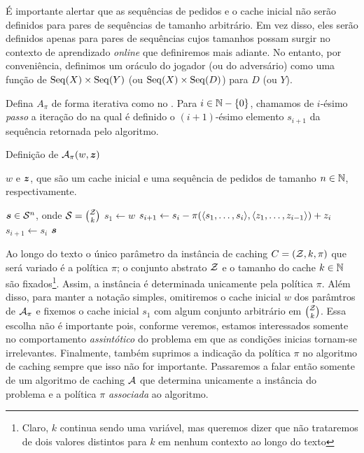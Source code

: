 É importante alertar que as sequências de pedidos e o cache inicial não serão definidos para pares de sequências de tamanho arbitrário. Em vez disso, eles serão definidos apenas para pares de sequências cujos tamanhos possam surgir no contexto de aprendizado \emph{online} que definiremos mais adiante. No entanto, por conveniência, definimos um oráculo do jogador (ou do adversário) como uma função de \(\operatorname{Seq}(X) \times \operatorname{Seq}(Y)\) (ou \(\operatorname{Seq}(X) \times \operatorname{Seq}(D)\)) para \(D\) (ou \(Y\)).

Defina \(A_\pi\) de forma iterativa como no . Para \(i \in \mathbb{N} - \{0\}\), chamamos de \(i\)-ésimo \emph{passo} a iteração do  na qual é definido o \((i+1)\)-ésimo elemento \(s_{i+1}\) da sequência retornada pelo algoritmo.

\begin{algorithm}
  \caption{Definição de \(\mathcal{A}_\pi(w, \bm{z})\)}
  \label{algo:cache}
  \begin{algorithmic}[1]
    \Require \(w\) e \(\bm{z}\), que são um cache inicial e uma sequência de pedidos de tamanho \(n \in \mathbb{N}\), respectivamente.

    \Ensure \(\bm{s} \in \mathcal{S}^n\), onde \(\mathcal{S} = \binom{\mathcal{Z}}{k}\)
    \State \(s_1 \gets w\)
    \State \(s_{i+1} \gets s_{i} - \pi(\langle s_1, \dotsc, s_{i}\rangle, \langle z_1, \dotsc, z_{i-1}\rangle) + z_i \) \label{linha}
    \Else
    \State \(s_{i+1} \gets s_i\)
    \EndIf
    \EndFor
    \State \Return \(\bm{s}\)
  \end{algorithmic}
\end{algorithm}

\newpage

Ao longo do texto o único parâmetro da instância de caching \(C = (\mathcal{Z}, k, \pi)\) que será variado é a política \(\pi\); o conjunto abstrato \(\mathcal{Z}\) e o tamanho do cache \(k \in \mathbb{N}\) são fixados\footnote{Claro, \(k\) continua sendo uma variável, mas queremos dizer que não trataremos de dois valores distintos para \(k\) em nenhum contexto ao longo do texto}. Assim, a instância é determinada unicamente pela política \(\pi\). Além disso, para manter a notação simples, omitiremos o cache inicial \(w\) dos parâmtros de \(\mathcal{A}_\pi\) e fixemos o cache inicial \(s_1\) com algum conjunto arbitrário em \(\binom{\mathcal{Z}}{k}\). Essa escolha não é importante pois, conforme veremos, estamos interessados somente no comportamento \emph{assintótico} do problema em que as condições inicias tornam-se irrelevantes. Finalmente, também suprimos a indicação da política \(\pi\) no algoritmo de caching sempre que isso não for importante. Passaremos a falar então somente de um algoritmo de caching \(\mathcal{A}\) que determina unicamente a instância do problema e a política \(\pi\) \emph{associada} ao algoritmo.

